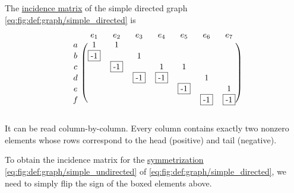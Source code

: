 \begin{example}\label{ex:graph_matrices}
  The \hyperref[def:multigraph_incidence_matrix]{incidence matrix} of the simple directed graph \eqref{eq:fig:def:graph/simple_directed} is
  \begin{equation}\label{ex:def:multigraph_incidence_matrix}
    \begin{blockarray}{cccccccc}
        & e_1       & e_2       & e_3       & e_4       & e_5       & e_6       & e_7       \\
      \begin{block}{c(ccccccc)}
      a & 1         & 1         &           &           &           &           &           \\
      b & \fbox{-1} &           & 1         &           &           &           &           \\
      c &           & \fbox{-1} &           & 1         & 1         &           &           \\
      d &           &           & \fbox{-1} & \fbox{-1} &           & 1         &           \\
      e &           &           &           &           & \fbox{-1} &           & 1         \\
      f &           &           &           &           &           & \fbox{-1} & \fbox{-1} \\
      \end{block}
    \end{blockarray}
  \end{equation}

  It can be read column-by-column. Every column contains exactly two nonzero elements whose rows correspond to the head (positive) and tail (negative).

  To obtain the incidence matrix for the \hyperref[rem:undirected_graphs_as_directed]{symmetrization} \eqref{eq:fig:def:graph/simple_undirected} of \eqref{eq:fig:def:graph/simple_directed}, we need to simply flip the sign of the boxed elements above.


\end{example}
